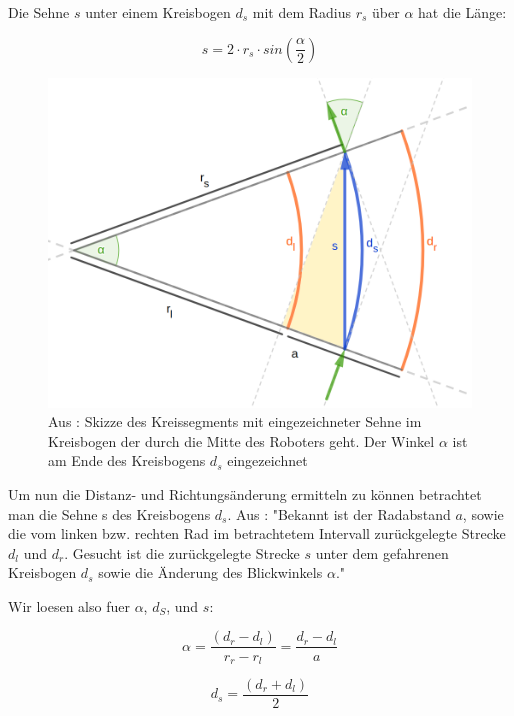 \documentclass[11pt,a4paper]{article}
\begin{document}
Die Sehne $s$ unter einem Kreisbogen $d_s$ mit dem Radius $r_s$ über $\alpha$ hat die Länge:

\begin{equation}
  s = 2 \cdot r_s \cdot sin(\frac{\alpha}{2})
\end{equation}

\begin{figure}[ht]
  \centering
  \includegraphics[width = 12cm]{richtungsaenderung.png}
  \caption{Aus \cite{website:dresden}: Skizze des Kreissegments mit eingezeichneter Sehne im Kreisbogen der durch die Mitte des Roboters geht. Der Winkel $\alpha$ ist am Ende
  des Kreisbogens $d_s$ eingezeichnet}
  \label{fig: Richtungsaenderung}
\end{figure}

Um nun die Distanz- und Richtungsänderung ermitteln zu können betrachtet man die Sehne s des Kreisbogens $d_s$. Aus \cite{website:dresden}:
"Bekannt ist der Radabstand $a$, sowie die vom linken bzw. rechten Rad im betrachtetem Intervall zurückgelegte Strecke $d_l$ und $d_r$. Gesucht 
ist die zurückgelegte Strecke $s$ unter dem gefahrenen Kreisbogen $d_s$ sowie die Änderung des Blickwinkels $\alpha$."

Wir loesen also fuer $\alpha$, $d_S$, und $s$: 

\begin{equation}
  \alpha = \frac{(d_r - d_l)}{r_r - r_l} = \frac{d_r - d_l}{a}
\end{equation}

\begin{equation}
  d_s = \frac{(d_r + d_l)}{2}
\end{equation}
\end{document}

